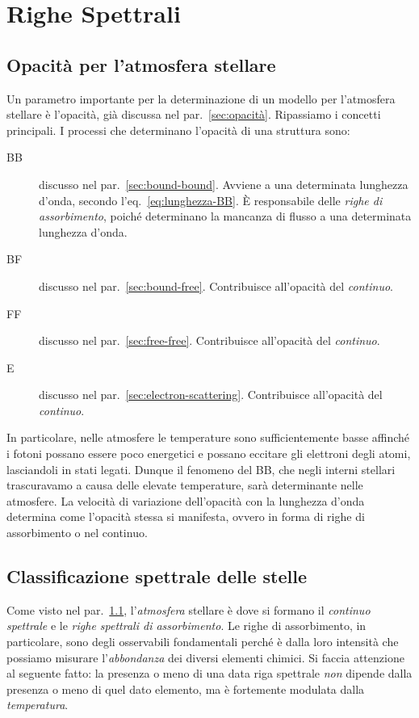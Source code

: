 \section{Righe Spettrali}\label{sec:righe-spettrali}

\subsection{Opacità per l'atmosfera stellare}\label{sec:opacita-atmosfera}
Un parametro importante per la determinazione di un modello per l'atmosfera stellare è l'opacità, già discussa nel par.~\ref{sec:opacità}. Ripassiamo i concetti principali. I processi che determinano l'opacità di una struttura sono:
\begin{description}
    \item[BB] discusso nel par.~\ref{sec:bound-bound}. Avviene a una determinata lunghezza d'onda, secondo l'eq.~\eqref{eq:lunghezza-BB}. È responsabile delle \emph{righe di assorbimento}, poiché determinano la mancanza di flusso a una determinata lunghezza d'onda.
    \item[BF] discusso nel par.~\ref{sec:bound-free}. Contribuisce all'opacità del \emph{continuo}.
    \item[FF] discusso nel par.~\ref{sec:free-free}. Contribuisce all'opacità del \emph{continuo}.
    \item[E] discusso nel par.~\ref{sec:electron-scattering}. Contribuisce all'opacità del \emph{continuo}.
\end{description}
In particolare, nelle atmosfere le temperature sono sufficientemente basse affinché i fotoni possano essere poco energetici e possano eccitare gli elettroni degli atomi, lasciandoli in stati legati. Dunque il fenomeno del BB, che negli interni stellari trascuravamo a causa delle elevate temperature, sarà determinante nelle atmosfere. La velocità di variazione dell'opacità con la lunghezza d'onda determina come l'opacità stessa si manifesta, ovvero in forma di righe di assorbimento o nel continuo.

\subsection{Classificazione spettrale delle stelle}
Come visto nel par.~\ref{sec:opacita-atmosfera}, l'\emph{atmosfera} stellare è dove si formano il \emph{continuo spettrale} e le \emph{righe spettrali di assorbimento}. Le righe di assorbimento, in particolare, sono degli osservabili fondamentali perché è dalla loro intensità che possiamo misurare l'\emph{abbondanza} dei diversi elementi chimici. Si faccia attenzione al seguente fatto: la presenza o meno di una data riga spettrale \emph{non} dipende dalla presenza o meno di quel dato elemento, ma è fortemente modulata dalla \emph{temperatura}.

